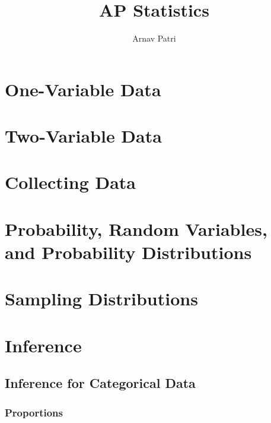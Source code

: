 \documentclass[12pt, A4]{report}
\title{AP Statistics}
\author{Arnav Patri}
\begin{document}
	\maketitle
	\tableofcontents
	\part{One-Variable Data}
		
	\part{Two-Variable Data}
		
	\part{Collecting Data}
		
	\part{Probability, Random Variables, and Probability Distributions}
		
	\part{Sampling Distributions}
		
	\part{Inference}
		\chapter{Inference for Categorical Data}
			\section{Proportions}
				
\end{document}
